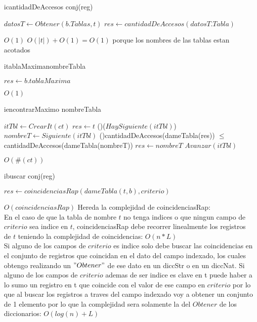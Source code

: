\begin{Algoritmos}
\begin{algoritmo}{icantidadDeAccesos}{ }{conj(reg)}

	$datosT \gets Obtener(b.Tablas,t)$ 
	$res \gets cantidadDeAccesos(datosT.Tabla)$ 
    
\end{algoritmo}

\datosAlgoritmo{} %
{} %
{} %
{$O(1)$} %
{$O(|t|) + O(1) = O(1)$ porque los nombres de las tablas estan acotados} %

\begin{algoritmo}{itablaMaxima}{}{nombreTabla}%

	$res \gets b.tablaMaxima$ 
   
\end{algoritmo}

\datosAlgoritmo{} %
{} %
{} %
{$O(1)$} %
{} %

\begin{algoritmo}{iencontrarMaximo}{  }{nombreTabla}%
		
	$itTbl \gets CrearIt(ct)$ 
	$res \gets t$ 
	\While(){($HaySiguiente(itTbl)$)}{
		$nombreT \gets Siguiente(itTbl)$ 
		\If(){cantidadDeAccesos(dameTabla(res)) $\leq$ cantidadDeAccesos(dameTabla(nombreT)) }{
            $res \gets nombreT$ 
        }
		$Avanzar(itTbl)$ 
    }
\end{algoritmo}
\datosAlgoritmo{} %
{} %
{} %
{$O(\#(ct))$} %
{} %

\begin{algoritmo}{ibuscar}{  }{conj(reg)}%

	$res \gets coincidenciasRap(dameTabla(t,b),criterio)$ 
    
\end{algoritmo}

\datosAlgoritmo{} %
{} %
{} %
{$O(coincidenciasRap)$} %
{Hereda la complejidad de coincidenciasRap: \\ En el caso de que la tabla de nombre $t$ no tenga indices o que ningun campo de $criterio$ sea indice en $t$, coincidenciasRap debe recorrer linealmente los registros de $t$ teniendo la complejidad de coincidencias: $O(n*L)$ \\ Si alguno de los campos de $criterio$ es indice solo debe buscar las coincidencias en el conjunto de registros que coincidan en el dato del campo indexado, los cuales obtengo realizando un $"Obtener"$ de ese dato en un diccStr o en un diccNat. Si alguno de los campos de $criterio$ ademas de ser indice es clave en t puede haber a lo sumo un registro en t que coincide con el valor de ese campo en $criterio$ por lo que al buscar los registros a traves del campo indexado voy a obtener un conjunto de 1 elemento por lo que la complejidad sera solamente la del $Obtener$ de los diccionarios: $O(log(n) + L)$} %

	
\end{Algoritmos}
    
    
    